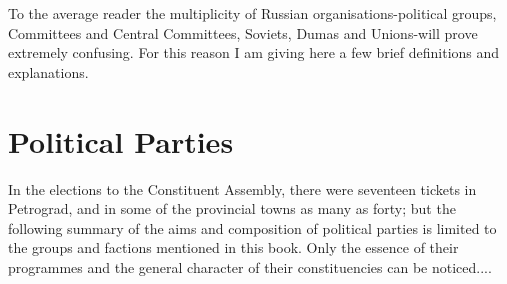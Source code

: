 To the average reader the multiplicity of Russian organisations-political groups, Committees and Central Committees, Soviets, Dumas and Unions-will prove extremely confusing. For this reason I am giving here a few brief definitions and explanations.

\section*{Political Parties}

In the elections to the Constituent Assembly, there were seventeen tickets in Petrograd, and in some of the provincial towns as many as forty; but the following summary of the aims and composition of political parties is limited to the groups and factions mentioned in this book. Only the essence of their programmes and the general character of their constituencies can be noticed....
